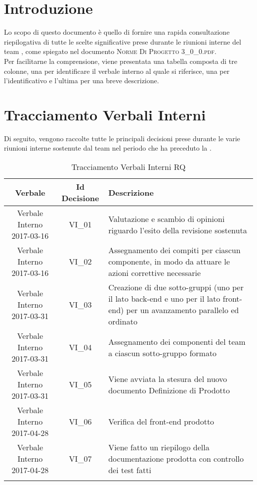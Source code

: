\section{Introduzione}
Lo scopo di questo documento è quello di fornire una rapida consultazione riepilogativa di tutte le scelte significative prese durante le riunioni interne del team \gruppo, come spiegato nel documento \textsc{Norme Di Progetto 3\_0\_0.pdf}.\\
Per facilitarne la comprensione, viene presentata una tabella composta di tre colonne, una per identificare il verbale interno al quale si riferisce, una per l'identificativo e l'ultima per una breve descrizione.

\section{Tracciamento Verbali Interni}
Di seguito, vengono raccolte tutte le principali decisioni prese durante le varie riunioni interne sostenute dal team nel periodo che ha preceduto la \RQ.

\begin{longtable}[H]{|c|c|p{7cm}|}
			\hline
			\textbf{Verbale} & \textbf{Id Decisione}	& \textbf{Descrizione} \\
			\hline
			Verbale Interno 2017-03-16 & VI\_01	&  Valutazione e scambio di opinioni riguardo l'esito della revisione sostenuta \\
			\hline
			Verbale Interno 2017-03-16 & VI\_02 &  Assegnamento dei compiti per ciascun componente, in modo da attuare le azioni correttive necessarie \\
			\hline
			Verbale Interno 2017-03-31 & VI\_03	& Creazione di due sotto-gruppi (uno per il lato back-end e uno per il lato front-end) per un avanzamento parallelo ed ordinato	\\
			\hline
			Verbale Interno 2017-03-31 & VI\_04 & Assegnamento dei componenti del team a ciascun sotto-gruppo formato \\
			\hline
			Verbale Interno 2017-03-31 & VI\_05 & Viene avviata la stesura del nuovo documento Definizione di Prodotto \\
			\hline
			Verbale Interno 2017-04-28 & VI\_06	&  Verifica del front-end prodotto \\
			\hline
			Verbale Interno 2017-04-28 & VI\_07 &  Viene fatto un riepilogo della documentazione prodotta con controllo dei test fatti \\
			\hline
		\caption{Tracciamento Verbali Interni RQ}
\end{longtable}